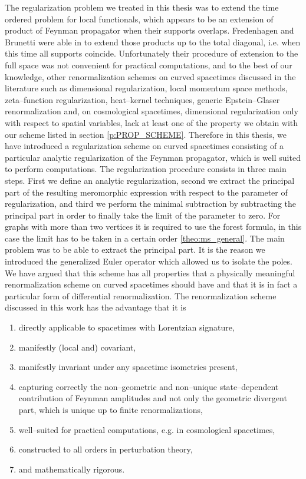 \documentclass[11pt]{book}
\theoremstyle{break}
\begin{document}
The regularization problem we treated in this thesis was to extend the time ordered problem for local functionals, which appears to be an extension of product of Feynman propagator when their supports overlaps. Fredenhagen and Brunetti were able in \cite{BF_2000} to extend those products up to the total diagonal, i.e. when this time all supports coincide. Unfortunately their procedure of extension to the full space was not convenient for practical computations, and to the best of our knowledge, other renormalization schemes on curved spacetimes discussed in the literature such as dimensional regularization, local momentum space methods, zeta--function regularization, heat--kernel techniques, generic Epstein--Glaser renormalization and, on cosmological spacetimes, dimensional regularization only with respect to spatial variables, lack at least one of the property we obtain with our scheme listed in section \ref{p:PROP_SCHEME}. Therefore in this thesis, we have introduced a regularization scheme on curved spacetimes consisting of a particular analytic regularization of the Feynman propagator, which is well suited to perform computations. The regularization procedure consists in three main steps. First we define an analytic regularization, second we extract the principal part of the resulting meromorphic expression with respect to the parameter of regularization, and third we perform the minimal subtraction by subtracting the principal part in order to finally take the limit of the parameter to zero. For graphs with more than two vertices it is required to use the forest formula, in this case the limit has to be taken in a certain order \ref{theo:ms_general}. The main problem was to be able to extract the principal part. It is the reason we introduced the generalized Euler operator which allowed us to isolate the poles. We have argued that this scheme has all properties that a physically meaningful renormalization scheme on curved spacetimes should have and that it is in fact a particular form of differential renormalization. The renormalization scheme discussed in this work has the advantage that it is 
%
\begin{enumerate}
\item directly applicable to spacetimes with Lorentzian signature, 
\item manifestly (local and) covariant, 
\item manifestly invariant under any spacetime isometries present,
\item capturing correctly the non--geometric and non--unique state--dependent contribution of Feynman amplitudes and not only the geometric divergent part, which is unique up to finite renormalizations,
\item well--suited for practical computations, e.g. in cosmological spacetimes,
\item constructed to all orders in perturbation theory,
\item and mathematically rigorous.
\end{enumerate}
\end{document}
